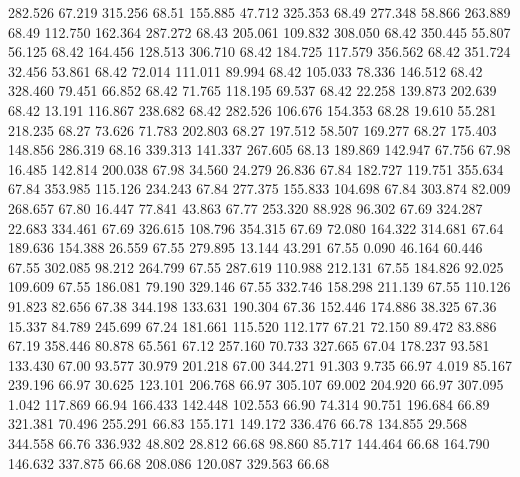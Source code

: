  282.526   67.219  315.256        68.51
 155.885   47.712  325.353        68.49
 277.348   58.866  263.889        68.49
 112.750  162.364  287.272        68.43
 205.061  109.832  308.050        68.42
 350.445   55.807   56.125        68.42
 164.456  128.513  306.710        68.42
 184.725  117.579  356.562        68.42
 351.724   32.456   53.861        68.42
  72.014  111.011   89.994        68.42
 105.033   78.336  146.512        68.42
 328.460   79.451   66.852        68.42
  71.765  118.195   69.537        68.42
  22.258  139.873  202.639        68.42
  13.191  116.867  238.682        68.42
 282.526  106.676  154.353        68.28
  19.610   55.281  218.235        68.27
  73.626   71.783  202.803        68.27
 197.512   58.507  169.277        68.27
 175.403  148.856  286.319        68.16
 339.313  141.337  267.605        68.13
 189.869  142.947   67.756        67.98
  16.485  142.814  200.038        67.98
  34.560   24.279   26.836        67.84
 182.727  119.751  355.634        67.84
 353.985  115.126  234.243        67.84
 277.375  155.833  104.698        67.84
 303.874   82.009  268.657        67.80
  16.447   77.841   43.863        67.77
 253.320   88.928   96.302        67.69
 324.287   22.683  334.461        67.69
 326.615  108.796  354.315        67.69
  72.080  164.322  314.681        67.64
 189.636  154.388   26.559        67.55
 279.895   13.144   43.291        67.55
   0.090   46.164   60.446        67.55
 302.085   98.212  264.799        67.55
 287.619  110.988  212.131        67.55
 184.826   92.025  109.609        67.55
 186.081   79.190  329.146        67.55
 332.746  158.298  211.139        67.55
 110.126   91.823   82.656        67.38
 344.198  133.631  190.304        67.36
 152.446  174.886   38.325        67.36
  15.337   84.789  245.699        67.24
 181.661  115.520  112.177        67.21
  72.150   89.472   83.886        67.19
 358.446   80.878   65.561        67.12
 257.160   70.733  327.665        67.04
 178.237   93.581  133.430        67.00
  93.577   30.979  201.218        67.00
 344.271   91.303    9.735        66.97
   4.019   85.167  239.196        66.97
  30.625  123.101  206.768        66.97
 305.107   69.002  204.920        66.97
 307.095    1.042  117.869        66.94
 166.433  142.448  102.553        66.90
  74.314   90.751  196.684        66.89
 321.381   70.496  255.291        66.83
 155.171  149.172  336.476        66.78
 134.855   29.568  344.558        66.76
 336.932   48.802   28.812        66.68
  98.860   85.717  144.464        66.68
 164.790  146.632  337.875        66.68
 208.086  120.087  329.563        66.68
